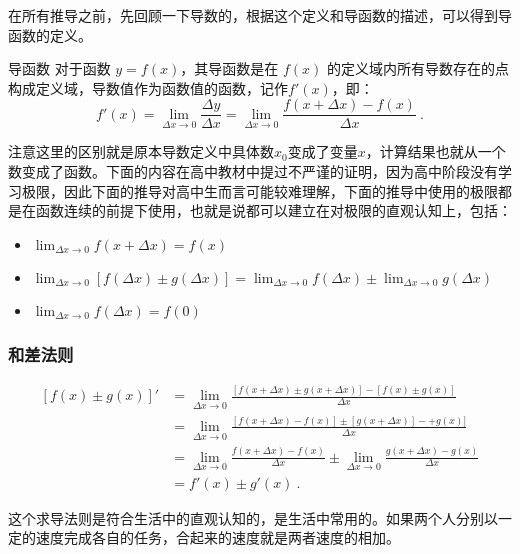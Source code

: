 在所有推导之前，先回顾一下导数的，根据这个定义和导函数的描述，可以得到导函数的定义。
\begin{definition}{导函数}\label{def_HsDerB_1}
对于函数 $y=f(x)$，其导函数是在 $f(x)$ 的定义域内所有导数存在的点构成定义域，导数值作为函数值的函数，记作$f'(x)$，即：
\begin{equation}
f'(x)=\lim_{\Delta x\to 0}\frac{\Delta y}{\Delta x}=\lim_{\Delta x\to0}\frac{f(x+\Delta x)-f(x)}{\Delta x}~.
\end{equation}
\end{definition}

注意这里的区别就是原本导数定义中具体数$x_0$变成了变量$x$，计算结果也就从一个数变成了函数。下面的内容在高中教材中提过不严谨的证明，因为高中阶段没有学习极限，因此下面的推导对高中生而言可能较难理解，下面的推导中使用的极限都是在函数连续的前提下使用，也就是说都可以建立在对极限的直观认知上，包括：
\begin{itemize}
\item $\displaystyle\lim_{\Delta x\to 0}f(x+\Delta x)=f(x)$
\item $\displaystyle\lim_{\Delta x\to 0}[f(\Delta x)\pm g(\Delta x)]=\lim_{\Delta x\to 0}f(\Delta x)\pm \lim_{\Delta x\to 0}g(\Delta x)$
\item $\displaystyle\lim_{\Delta x\to 0}f(\Delta x)=f(0)$
\end{itemize}


\subsubsection{和差法则}

\begin{equation}
\begin{split}
\left[f(x)\pm g(x)\right]'&=\lim_{\Delta x\to 0}\frac{[f(x+\Delta x)\pm g(x+\Delta x)]-[f(x)\pm g(x)]}{\Delta x}\\
&=\lim_{\Delta x\to 0}\frac{[f(x+\Delta x)-f(x)]\pm [g(x+\Delta x)]-+g(x)]}{\Delta x}\\
&=\lim_{\Delta x\to 0}\frac{f(x+\Delta x)-f(x)}{\Delta x}\pm\lim_{\Delta x\to 0}\frac{g(x+\Delta x)-g(x)}{\Delta x}\\
&=f'(x)\pm g'(x)~.
\end{split}
\end{equation}


这个求导法则是符合生活中的直观认知的，是生活中常用的。如果两个人分别以一定的速度完成各自的任务，合起来的速度就是两者速度的相加。

